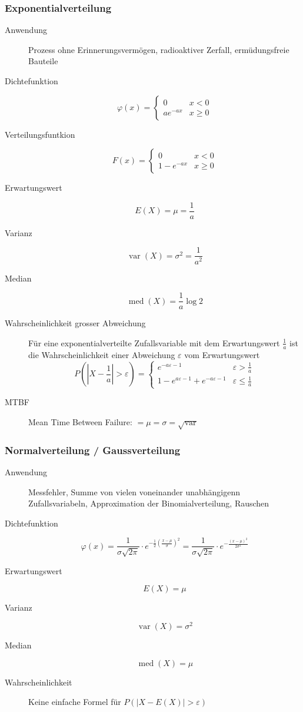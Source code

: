 \subsubsection{Exponentialverteilung}
\begin{description}
  \item[Anwendung] Prozess ohne Erinnerungsvermögen, radioaktiver
  Zerfall, ermüdungsfreie Bauteile
  \item[Dichtefunktion] \[\varphi(x) = \begin{cases}0 & x < 0 \\ ae^{-ax} &
    x \geq 0\end{cases}\]
  \item[Verteilungsfuntkion] \[F(x) = \begin{cases}0 & x < 0 \\
    1-e^{-ax} & x \geq 0\end{cases}\]
  \item[Erwartungswert] \[E(X) = \mu = \frac{1}{a}\]
  \item[Varianz] \[\operatorname{var}(X) = \sigma^2 = \frac{1}{a^2}\]
  \item[Median] \[\operatorname{med}(X) = \frac{1}{a}\log 2\]
  \item[Wahrscheinlichkeit grosser Abweichung] Für eine
    exponentialverteilte Zufallsvariable mit dem Erwartungswert
    $\frac{1}{a}$ ist die Wahrscheinlichkeit einer Abweichung
    $\varepsilon$ vom Erwartungswert \[P(|X-\frac{1}{a}| > \varepsilon) =
    \begin{cases}e^{-a\varepsilon-1} & \varepsilon > \frac{1}{a} \\
    1 - e^{a\varepsilon-1} + e^{-a\varepsilon-1} & \varepsilon \leq
    \frac{1}{a}\end{cases}\]
  \item[MTBF] Mean Time Between Failure:
    $= \mu = \sigma = \sqrt{\operatorname{var}}$
\end{description}

\subsubsection{Normalverteilung / Gaussverteilung}
\begin{description}
  \item[Anwendung] Messfehler, Summe von vielen voneinander
    unabhängigenn Zufallsvariabeln, Approximation der
    Binomialverteilung, Rauschen
  \item[Dichtefunktion] \[\varphi(x) = \frac{1}{\sigma \sqrt{2\pi}} \cdot 
    e^{-\frac{1}{2}{\left(\frac{x-\mu}{\sigma}\right)}^2} =
    \frac{1}{\sigma \sqrt{2\pi}} \cdot e^{-\frac{(x-\mu)^2}{2\sigma^2}}\]
  \item[Erwartungswert] \[E(X) = \mu\]
  \item[Varianz] \[\operatorname{var}(X) = \sigma^2\]
  \item[Median] \[\operatorname{med}(X) = \mu\]
  \item[Wahrscheinlichkeit] Keine einfache Formel für
    $P(|X - E(X)| > \varepsilon)$
\end{description}

